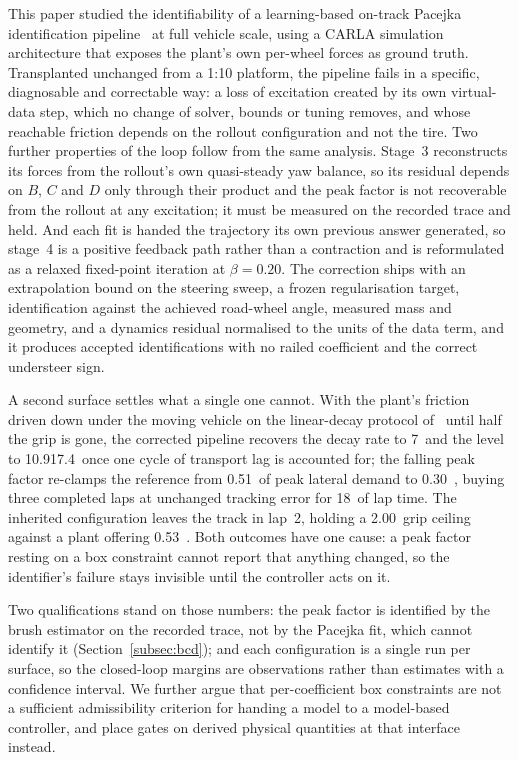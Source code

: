 \documentclass[lineno,12pt]{sn-jnl}
\makeatletter
\newif\ifsiu@prev
\DeclareRobustCommand{\siu@sep}{\ifsiu@prev\,\fi}
\DeclareRobustCommand{\siu@unit}[1]{\siu@sep\text{#1}\siu@prevtrue}
\DeclareRobustCommand{\siu@pre}[1]{\siu@sep\text{#1}\siu@prevfalse}
\DeclareRobustCommand{\siu@div}[1]{\text{#1}\siu@prevfalse}
\DeclareRobustCommand{\meter}{m}
\DeclareRobustCommand{\second}{s}
\DeclareRobustCommand{\gram}{g}
\DeclareRobustCommand{\newton}{N}
\DeclareRobustCommand{\radian}{rad}
\DeclareRobustCommand{\hertz}{Hz}
\DeclareRobustCommand{\percent}{\%}
\DeclareRobustCommand{\g}{\textit{g}}
\DeclareRobustCommand{\kilo}{k}
\DeclareRobustCommand{\milli}{m}
\DeclareRobustCommand{\per}{/}
\DeclareRobustCommand{\squared}{\ensuremath{^{2}}}
\providecommand{\degree}{\ensuremath{^{\circ}}}
\DeclareRobustCommand{\si}[1]{\begingroup
  \siu@prevfalse
  \renewcommand{\meter}{\siu@unit{m}}%
  \renewcommand{\second}{\siu@unit{s}}%
  \renewcommand{\gram}{\siu@unit{g}}%
  \renewcommand{\newton}{\siu@unit{N}}%
  \renewcommand{\radian}{\siu@unit{rad}}%
  \renewcommand{\hertz}{\siu@unit{Hz}}%
  \renewcommand{\percent}{\siu@unit{\%}}%
  \renewcommand{\degree}{\siu@unit{\ensuremath{^{\circ}}}}%
  \renewcommand{\g}{\siu@unit{\textit{g}}}%
  \renewcommand{\kilo}{\siu@pre{k}}%
  \renewcommand{\milli}{\siu@pre{m}}%
  \renewcommand{\per}{\siu@div{/}}%
  \renewcommand{\squared}{\ensuremath{^{2}}}%
  #1\endgroup}
\DeclareRobustCommand{\num}[1]{#1}
\DeclareRobustCommand{\SI}[2]{#1\,\si{#2}}
\DeclareRobustCommand{\SIrange}[3]{#1\text{--}#2\,\si{#3}}
\theoremstyle{thmstyleone}%
\theoremstyle{thmstyletwo}%
\theoremstyle{thmstylethree}%
\makeatother
\begin{document}
This paper studied the identifiability of a learning-based on-track Pacejka
identification pipeline~\cite{ontrack2025} at full vehicle scale, using a CARLA
simulation architecture that exposes the plant's own per-wheel forces as ground
truth. Transplanted unchanged from a 1:10 platform, the pipeline fails in a
specific, diagnosable and correctable way: a loss of excitation created by its
own virtual-data step, which no change of solver, bounds or tuning removes, and
whose reachable friction depends on the rollout configuration and not the tire.
Two further properties of the loop follow from the same analysis. Stage~3
reconstructs its forces from the rollout's own quasi-steady yaw balance, so its
residual depends on $B$, $C$ and $D$ only through their product and the peak
factor is not recoverable from the rollout at any excitation; it must be
measured on the recorded trace and held. And each fit is handed the trajectory
its own previous answer generated, so stage~4 is a positive feedback path
rather than a contraction and is reformulated as a relaxed fixed-point
iteration at $\beta=\num{0.20}$. The correction ships with an extrapolation
bound on the steering sweep, a frozen regularisation target, identification
against the achieved road-wheel angle, measured mass and geometry, and a
dynamics residual normalised to the units of the data term, and it produces
accepted identifications with no railed coefficient and the correct understeer
sign.

A second surface settles what a single one cannot. With the plant's friction
driven down under the moving vehicle on the linear-decay protocol
of~\cite{llampc2025} until half the grip is gone, the corrected pipeline
recovers the decay rate to \SI{7}{\percent} and the level to
\SIrange{10.9}{17.4}{\percent} once one cycle of transport lag is accounted
for; the falling peak factor re-clamps the reference from \SI{0.51}{\g} of peak
lateral demand to \SI{0.30}{\g}, buying three completed laps at unchanged
tracking error for \SI{18}{\percent} of lap time. The inherited configuration
leaves the track in lap~2, holding a \SI{2.00}{\g} grip ceiling against a plant
offering \SI{0.53}{\g}. Both outcomes have one cause: a peak factor resting on
a box constraint cannot report that anything changed, so the identifier's
failure stays invisible until the controller acts on it.

Two qualifications stand on those numbers: the peak factor is identified by the
brush estimator on the recorded trace, not by the Pacejka fit, which cannot
identify it (Section~\ref{subsec:bcd}); and each configuration is a single run
per surface, so the closed-loop margins are observations rather than estimates
with a confidence interval. We further argue that per-coefficient box
constraints are not a sufficient admissibility criterion for handing a model to
a model-based controller, and place gates on derived physical quantities at
that interface instead.
\end{document}
